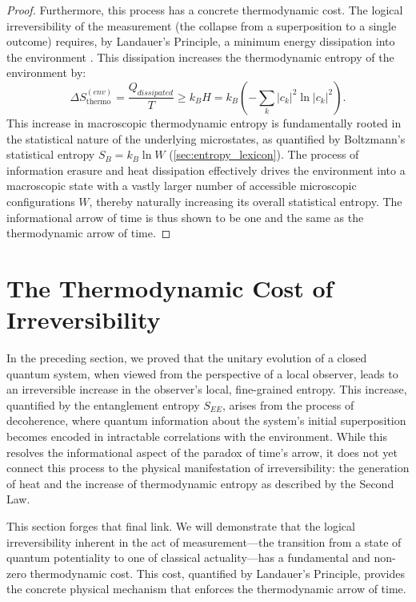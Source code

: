 \documentclass[11pt, letterpaper]{report}
\theoremstyle{plain} %
\theoremstyle{definition} %
\theoremstyle{remark} %
\begin{document}
\begin{proof}
Furthermore, this process has a concrete thermodynamic cost. The logical irreversibility of the measurement (the collapse from a superposition to a single outcome) requires, by Landauer's Principle, a minimum energy dissipation into the environment \cite{Landauer1961, Bennett1982}. This dissipation increases the thermodynamic entropy of the environment by:
\begin{equation}
        \Delta S_{\text{thermo}}^{(env)} = \frac{Q_{dissipated}}{T} \ge k_B H = k_B \left(-\sum_k |c_k|^2 \ln |c_k|^2\right).
\end{equation}
This increase in macroscopic thermodynamic entropy is fundamentally rooted in the statistical nature of the underlying microstates, as quantified by Boltzmann's statistical entropy $S_B = k_B \ln W$ (\cref{sec:entropy_lexicon}). The process of information erasure and heat dissipation effectively drives the environment into a macroscopic state with a vastly larger number of accessible microscopic configurations $W$, thereby naturally increasing its overall statistical entropy. The informational arrow of time is thus shown to be one and the same as the thermodynamic arrow of time.
\end{proof}


\section{The Thermodynamic Cost of Irreversibility}
\label{sec:thermodynamic_cost}

In the preceding section, we proved that the unitary evolution of a closed quantum system, when viewed from the perspective of a local observer, leads to an irreversible increase in the observer's local, fine-grained entropy. This increase, quantified by the entanglement entropy $S_{EE}$, arises from the process of decoherence, where quantum information about the system's initial superposition becomes encoded in intractable correlations with the environment. While this resolves the informational aspect of the paradox of time's arrow, it does not yet connect this process to the physical manifestation of irreversibility: the generation of heat and the increase of thermodynamic entropy as described by the Second Law.

This section forges that final link. We will demonstrate that the logical irreversibility inherent in the act of measurement—the transition from a state of quantum potentiality to one of classical actuality—has a fundamental and non-zero thermodynamic cost. This cost, quantified by Landauer's Principle, provides the concrete physical mechanism that enforces the thermodynamic arrow of time.
\end{document}
